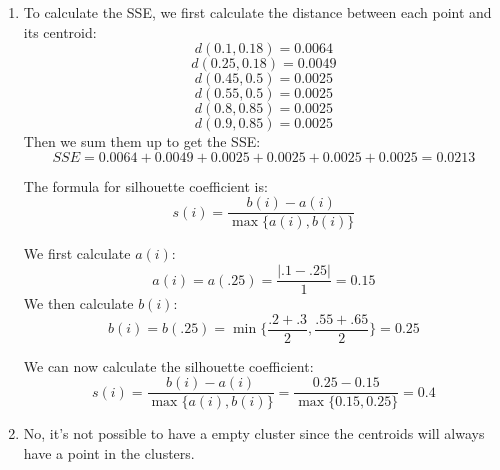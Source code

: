 \documentclass{article}
\begin{document}
\begin{enumerate}
    \item To calculate the SSE, we first calculate the distance between each point and its centroid:
    \begin{equation}
        d(0.1,0.18) = 0.0064
    \end{equation}
    \begin{equation}
        d(0.25,0.18) = 0.0049
    \end{equation}
    \begin{equation}
        d(0.45,0.5) = 0.0025
    \end{equation}
    \begin{equation}
        d(0.55,0.5) = 0.0025
    \end{equation}
    \begin{equation}
        d(0.8,0.85) = 0.0025
    \end{equation}
    \begin{equation}
        d(0.9,0.85) = 0.0025
    \end{equation}
    Then we sum them up to get the SSE\@:
    \begin{equation}
        SSE = 0.0064 + 0.0049 + 0.0025 + 0.0025 + 0.0025 + 0.0025 = 0.0213
    \end{equation}

    The formula for silhouette coefficient is:
    \begin{equation}
        s(i) = \frac{b(i) - a(i)}{\max\{a(i),b(i)\}}
    \end{equation}

    We first calculate $a(i)$:
    \begin{equation}
        a(i) = a(.25) = \frac{|.1 - .25|}{1} = 0.15
    \end{equation}
    We then calculate $b(i)$:
    \begin{equation}
        b(i) =  b(.25) = \min{\{\frac{.2 + .3}{2}, \frac{.55 + .65}{2}\}} = 0.25
    \end{equation}

    We can now calculate the silhouette coefficient:
    \begin{equation}
        s(i) = \frac{b(i) - a(i)}{\max\{a(i),b(i)\}} = \frac{0.25 - 0.15}{\max\{0.15,0.25\}} = 0.4
    \end{equation}

    \item No, it's not possible to have a empty cluster since the centroids will always have a point in the clusters.
\end{enumerate}
\end{document}
